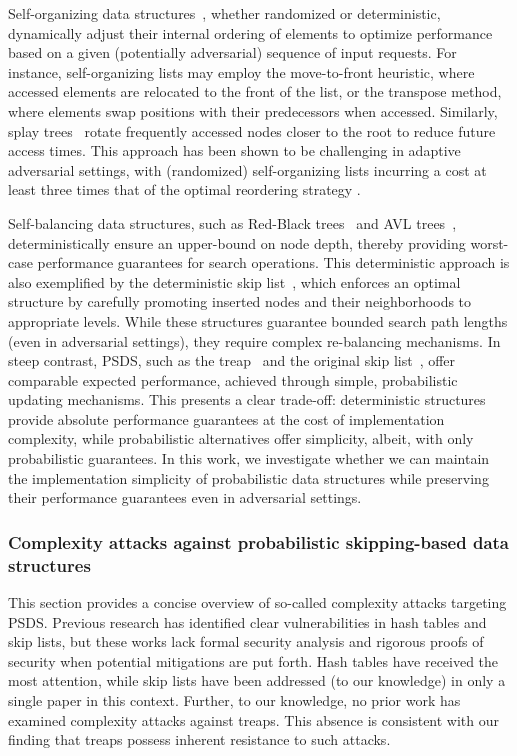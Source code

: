 Self-organizing data structures~\cite{albers2005self}, whether randomized or deterministic, dynamically adjust their internal ordering of elements to optimize performance based on a given (potentially adversarial) sequence of input requests. For instance, self-organizing lists may employ the move-to-front heuristic, where accessed elements are relocated to the front of the list, or the transpose method, where elements swap positions with their predecessors when accessed. Similarly, splay trees~\cite{sleator1985self} rotate frequently accessed nodes closer to the root to reduce future access times. This approach has been shown to be challenging in adaptive adversarial settings, with (randomized) self-organizing lists incurring a cost at least three times that of the optimal reordering strategy \cite{reingold1994randomized}. 

Self-balancing data structures, such as Red-Black trees~\cite{bayer1972symmetric} and AVL trees~\cite{adel1962algorithm}, deterministically ensure an upper-bound on node depth, thereby providing worst-case performance guarantees for search operations. This deterministic approach is also exemplified by the deterministic skip list~\cite{munro1992deterministic}, which enforces an optimal structure by carefully promoting inserted nodes and their neighborhoods to appropriate levels. While these structures guarantee bounded search path lengths (even in adversarial settings), they require complex re-balancing mechanisms. In steep contrast, PSDS, such as the treap~\cite{seidel1996randomized} and the original skip list~\cite{pugh}, offer comparable expected performance, achieved through simple, probabilistic updating mechanisms. This presents a clear trade-off: deterministic structures provide absolute performance guarantees at the cost of implementation complexity, while probabilistic alternatives offer simplicity, albeit, with only probabilistic guarantees. In this work, we investigate whether we can maintain the implementation simplicity of probabilistic data structures while preserving their performance guarantees even in adversarial settings.

\subsubsection{Complexity attacks against probabilistic skipping-based data structures}

This section provides a concise overview of so-called complexity attacks targeting PSDS. Previous research has identified clear vulnerabilities in hash tables and skip lists, but these works lack formal security analysis and rigorous proofs of security when potential mitigations are put forth. Hash tables have received the most attention, while skip lists have been addressed (to our knowledge) in only a single paper in this context. Further, to our knowledge, no prior work has examined complexity attacks against treaps. This absence is consistent with our finding that treaps possess inherent resistance to such attacks.


